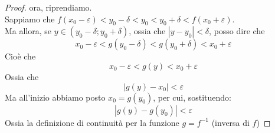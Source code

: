 \documentclass{article}
\theoremstyle{definition}
\begin{document}
\begin{proof}
ora, riprendiamo.
\\
Sappiamo che $f(x_0-\varepsilon)<y_0-\delta<y_0<y_0+\delta<f(x_0+\varepsilon)$.
\\
Ma allora, se $y \in (y_0-\delta;y_0+\delta)$, ossia che $|y-y_0|<\delta$, posso dire che 
\begin{equation}
    x_0-\varepsilon<g(y_0-\delta)<g(y_0+\delta)<x_0+\varepsilon
\end{equation}
Cioè che
\begin{equation}
    x_0-\varepsilon<g(y)<x_0+\varepsilon
\end{equation}
    Ossia che
    \begin{equation}
        |g(y)-x_0|<\varepsilon
    \end{equation}
    Ma all'inizio abbiamo posto $x_0=g(y_0)$, per cui, sostituendo:
    \begin{equation}
        |g(y)-g(y_0)|<\varepsilon
    \end{equation}
    Ossia la definizione di continuità per la funzione $g=f^{-1}$ (inversa di $f$)
\end{proof}

\newpage
\end{document}
